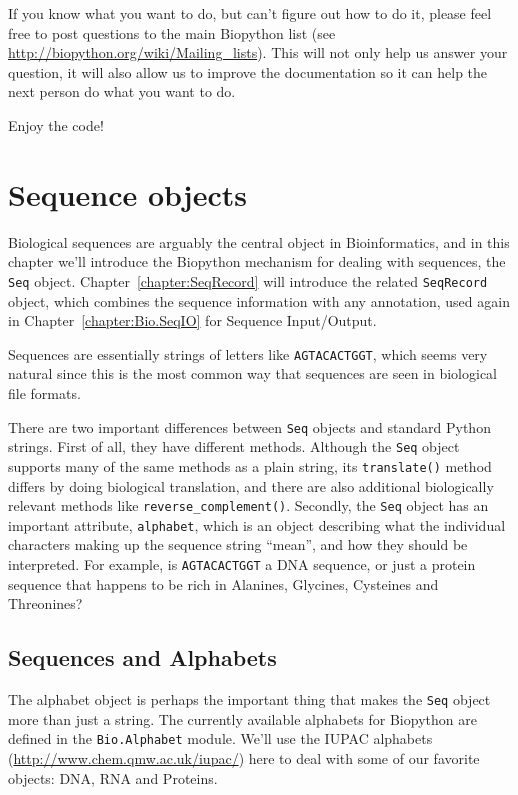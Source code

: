 \documentclass{report}
\begin{document}
If you know what you want to do, but can't figure out how to do it, please feel free to post questions to the main Biopython list (see \url{http://biopython.org/wiki/Mailing_lists}). This will not only help us answer your question, it will also allow us to improve the documentation so it can help the next person do what you want to do.

Enjoy the code!

\chapter{Sequence objects}
\label{chapter:Bio.Seq}

Biological sequences are arguably the central object in Bioinformatics, and in this chapter we'll introduce the Biopython mechanism for dealing with sequences, the \verb|Seq| object.
Chapter~\ref{chapter:SeqRecord} will introduce the related \verb|SeqRecord| object, which combines the sequence information with any annotation, used again in Chapter~\ref{chapter:Bio.SeqIO} for Sequence Input/Output.

Sequences are essentially strings of letters like \verb|AGTACACTGGT|, which seems very natural since this is the most common way that sequences are seen in biological file formats.

There are two important differences between \verb|Seq| objects and standard Python strings.
First of all, they have different methods.  Although the \verb|Seq| object supports many of the same methods as a plain string, its \verb|translate()| method differs by doing biological translation, and there are also additional biologically relevant methods like \verb|reverse_complement()|.
Secondly, the \verb|Seq| object has an important attribute, \verb|alphabet|, which is an object describing what the individual characters making up the sequence string ``mean'', and how they should be interpreted.  For example, is \verb|AGTACACTGGT| a DNA sequence, or just a protein sequence that happens to be rich in Alanines, Glycines, Cysteines
and Threonines?

\section{Sequences and Alphabets}

The alphabet object is perhaps the important thing that makes the \verb|Seq| object more than just a string. The currently available alphabets for Biopython are defined in the \verb|Bio.Alphabet| module. We'll use the IUPAC alphabets (\url{http://www.chem.qmw.ac.uk/iupac/}) here to deal with some of our favorite objects: DNA, RNA and Proteins.
\end{document}
